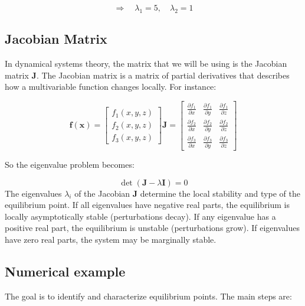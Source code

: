 \documentclass[
]{article}
\begin{document}
\[
\Rightarrow \quad \lambda_1 = 5, \quad \lambda_2 = 1
\]

\hypertarget{jacobian-matrix}{%
\subsection{Jacobian Matrix}\label{jacobian-matrix}}

In dynamical systems theory, the matrix that we will be using is the
Jacobian matrix \(\mathbf{J}\). The Jacobian matrix is a matrix of
partial derivatives that describes how a multivariable function changes
locally. For instance:

\[
\mathbf{f}(\mathbf{x}) =
\begin{bmatrix}
f_1(x, y, z) \\
f_2(x, y, z) \\
f_3(x, y, z)
\end{bmatrix}
\mathbf{J} =
\begin{bmatrix}
\frac{\partial f_1}{\partial x} & \frac{\partial f_1}{\partial y} & \frac{\partial f_1}{\partial z} \\
\frac{\partial f_2}{\partial x} & \frac{\partial f_2}{\partial y} & \frac{\partial f_2}{\partial z} \\
\frac{\partial f_3}{\partial x} & \frac{\partial f_3}{\partial y} & \frac{\partial f_3}{\partial z}
\end{bmatrix}
\]

So the eigenvalue problem becomes:

\[
\det(\mathbf{J} - \lambda \mathbf{I}) = 0
\] The eigenvalues \(\lambda_i\) of the Jacobian \(\mathbf{J}\)
determine the local stability and type of the equilibrium point. If all
eigenvalues have negative real parts, the equilibrium is locally
asymptotically stable (perturbations decay). If any eigenvalue has a
positive real part, the equilibrium is unstable (perturbations grow). If
eigenvalues have zero real parts, the system may be marginally stable.

\hypertarget{numerical-example}{%
\subsection{Numerical example}\label{numerical-example}}

The goal is to identify and characterize equilibrium points. The main
steps are:
\end{document}
